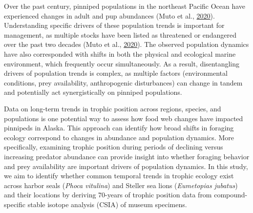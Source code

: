 \documentclass [11pt, proquest] {uwthesis}[2015/03/03]
\begin{document}
Over the past century, pinniped populations in the northeast Pacific
Ocean have experienced changes in adult and pup abundances (Muto et al.,
\protect\hyperlink{ref-Muto2020}{2020}). Understanding specific drivers
of these population trends is important for management, as multiple
stocks have been listed as threatened or endangered over the past two
decades (Muto et al., \protect\hyperlink{ref-Muto2020}{2020}). The
observed population dynamics have also corresponded with shifts in both
the physical and ecological marine environment, which frequently occur
simultaneously. As a result, disentangling drivers of population trends
is complex, as multiple factors (environmental conditions, prey
availability, anthropogenic disturbances) can change in tandem and
potentially act synergistically on pinniped populations.

Data on long-term trends in trophic position across regions, species,
and populations is one potential way to assess how food web changes have
impacted pinnipeds in Alaska. This approach can identify how broad
shifts in foraging ecology correspond to changes in abundance and
population dynamics. More specifically, examining trophic position
during periods of declining versus increasing predator abundance can
provide insight into whether foraging behavior and prey availability are
important drivers of population dynamics. In this study, we aim to
identify whether common temporal trends in trophic ecology exist across
harbor seals (\emph{Phoca vitulina}) and Steller sea lions
(\emph{Eumetopias jubatus}) and their locations by deriving 70-years of
trophic position data from compound-specific stable isotope analysis
(CSIA) of museum specimens.
\end{document}
